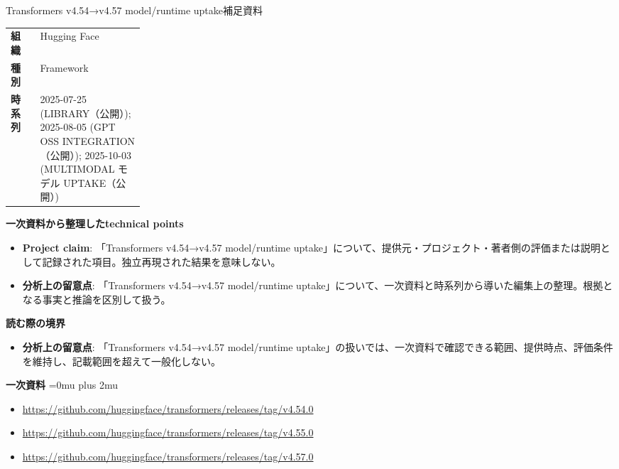 \begin{technicalnote}{Transformers v4.54→v4.57 model/runtime uptake}{補足資料}
\begingroup
\begin{tabularx}{\linewidth}{@{}>{\bfseries}p{0.22\linewidth}X@{}}
組織 & Hugging Face \\
種別 & Framework \\
時系列 & 2025-07-25 (LIBRARY（公開）); 2025-08-05 (GPT OSS INTEGRATION（公開）); 2025-10-03 (MULTIMODAL モデル UPTAKE（公開）) \\
\end{tabularx}
\smallskip
{\bfseries 一次資料から整理したtechnical points}
\begin{itemize}[leftmargin=1.5em,itemsep=0.35em]
\item \textbf{Project claim}: 「Transformers v4.54→v4.57 model/runtime uptake」について、提供元・プロジェクト・著者側の評価または説明として記録された項目。独立再現された結果を意味しない。
\item \textbf{分析上の留意点}: 「Transformers v4.54→v4.57 model/runtime uptake」について、一次資料と時系列から導いた編集上の整理。根拠となる事実と推論を区別して扱う。
\end{itemize}
\begin{minipage}{\linewidth}
{\bfseries 読む際の境界}
\begin{itemize}[leftmargin=1.5em,itemsep=0.35em]
\item \textbf{分析上の留意点}: 「Transformers v4.54→v4.57 model/runtime uptake」の扱いでは、一次資料で確認できる範囲、提供時点、評価条件を維持し、記載範囲を超えて一般化しない。
\end{itemize}
\begin{samepage}
{\bfseries 一次資料}
\begingroup\sloppy
\Urlmuskip=0mu plus 2mu\relax
\begin{itemize}[leftmargin=1.5em,itemsep=0.25em]
\item {\scriptsize\url{https://github.com/huggingface/transformers/releases/tag/v4.54.0}}
\item {\scriptsize\url{https://github.com/huggingface/transformers/releases/tag/v4.55.0}}
\item {\scriptsize\url{https://github.com/huggingface/transformers/releases/tag/v4.57.0}}
\end{itemize}
\endgroup
\end{samepage}
\end{minipage}
\endgroup
\end{technicalnote}
\medskip
